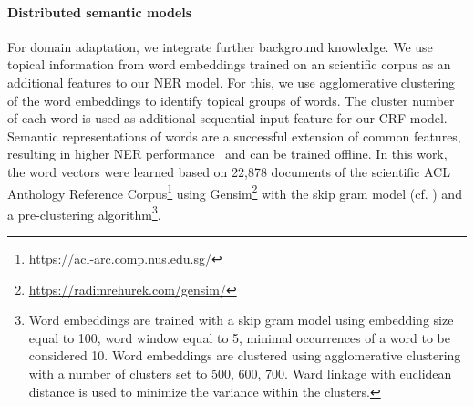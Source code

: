 \paragraph{Distributed semantic models}%
\label{subsec:dist-model}
For domain adaptation, we integrate further background knowledge.
We use topical information from word embeddings trained on an scientific corpus as an additional features to our NER model.
For this, we use agglomerative clustering of the word embeddings to identify topical groups of words.
The cluster number of each word is used as additional sequential input feature for our CRF model.
Semantic representations of words are a successful extension of common features, resulting in higher NER performance~\cite{Turian} and can be trained offline.
In this work, the word vectors were learned based on 22,878 documents of the scientific ACL Anthology Reference Corpus\footnote{\url{https://acl-arc.comp.nus.edu.sg/}} using Gensim\footnote{\url{https://radimrehurek.com/gensim/}} with the skip gram model (cf. \cite{mikolov2013distributed}) 
and a pre-clustering algorithm\footnote{
Word embeddings are trained with a skip gram model using embedding size equal to 100, word window equal to 5, minimal occurrences of a word to be considered 10. Word embeddings are clustered using agglomerative clustering with a number of clusters set to {500, 600, 700}. Ward linkage with euclidean distance is used to minimize the variance within the clusters.}.

